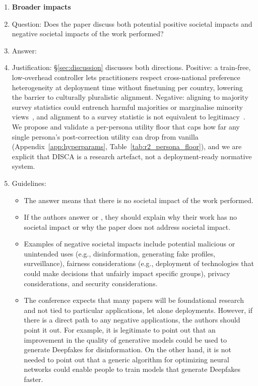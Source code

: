 \begin{enumerate}
\item {\bf Broader impacts}
    \item[] Question: Does the paper discuss both potential positive societal impacts and negative societal impacts of the work performed?
    \item[] Answer: \answerYes{}
    \item[] Justification: \S\ref{sec:discussion} discusses both directions. Positive: a train-free, low-overhead controller lets practitioners respect cross-national preference heterogeneity at deployment time without finetuning per country, lowering the barrier to culturally pluralistic alignment. Negative: aligning to majority survey statistics could entrench harmful majorities or marginalise minority views~\citep{zewail2025moral}, and alignment to a survey statistic is not equivalent to legitimacy~\citep{atari2023humans}. We propose and validate a per-persona utility floor that caps how far any single persona's post-correction utility can drop from vanilla (Appendix~\ref{app:hyperparams}, Table~\ref{tab:r2_persona_floor}), and we are explicit that DISCA is a research artefact, not a deployment-ready normative system.
    \item[] Guidelines:
    \begin{itemize}
        \item The answer \answerNA{} means that there is no societal impact of the work performed.
        \item If the authors answer \answerNA{} or \answerNo, they should explain why their work has no societal impact or why the paper does not address societal impact.
        \item Examples of negative societal impacts include potential malicious or unintended uses (e.g., disinformation, generating fake profiles, surveillance), fairness considerations (e.g., deployment of technologies that could make decisions that unfairly impact specific groups), privacy considerations, and security considerations.
        \item The conference expects that many papers will be foundational research and not tied to particular applications, let alone deployments. However, if there is a direct path to any negative applications, the authors should point it out. For example, it is legitimate to point out that an improvement in the quality of generative models could be used to generate Deepfakes for disinformation. On the other hand, it is not needed to point out that a generic algorithm for optimizing neural networks could enable people to train models that generate Deepfakes faster.

\end{itemize}
\end{enumerate}

